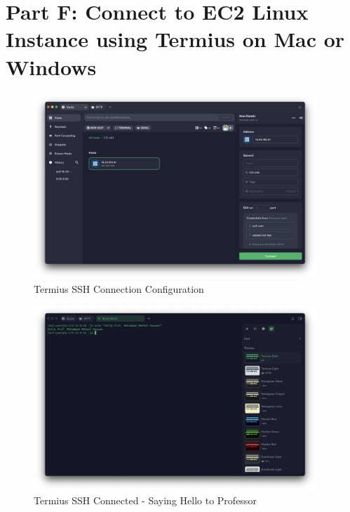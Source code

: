\documentclass[a4paper,12pt]{article}
\begin{document}
\newpage

\section{Part F: Connect to EC2 Linux Instance using Termius on Mac or Windows}

\begin{figure}[H]
    \centering
    \includegraphics[width=0.95\textwidth]{termius-1.png}
    \caption{Termius SSH Connection Configuration}
    \label{fig:termius1}
\end{figure}

\begin{figure}[H]
    \centering
    \includegraphics[width=0.95\textwidth]{termius-2.png}
    \caption{Termius SSH Connected - Saying Hello to Professor}
    \label{fig:termius2}
\end{figure}
\end{document}
